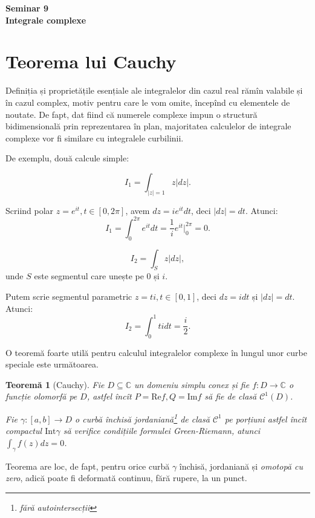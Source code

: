\documentclass[12pt,a4paper]{article}
\newcommand\kal{\mathcal}
\newcommand\ds{\displaystyle}
\newcommand\seq{\subseteq}
\newcommand\CC{\mathbb{C}}
\theoremstyle{dotless}
\newtheorem{theorem}{Teorem\u{a}}
\theoremstyle{dotlessdr}
\begin{document}

\begin{center}
  {\large\textbf{Seminar 9 \\
      Integrale complexe}}
\end{center}

\vspace{2cm}

\section*{Teorema lui Cauchy}

\indent\indent Definiția și proprietățile esențiale ale integralelor din cazul real
rămîn valabile și în cazul complex, motiv pentru care le vom omite, începînd cu elementele
de noutate. De fapt, dat fiind că numerele complexe impun o structură bidimensională
prin reprezentarea în plan, majoritatea calculelor de integrale complexe vor fi
similare cu integralele curbilinii.

De exemplu, două calcule simple:

\[
  I_1 = \ds\int_{|z| = 1} z |dz|.
\]

Scriind polar $ z = e^{it}, t \in [0, 2\pi] $, avem $ dz = ie^{it} dt $, deci
$ |dz| = dt $. Atunci:
\[
  I_1 = \int_0^{2\pi} e^{it} dt = \frac{1}{i} e^{it} \Big|_0^{2\pi} = 0.
\]

\[
  I_2 = \int_S z |dz|,
\]
unde $ S $ este segmentul care unește pe $ 0 $ și $ i $.

Putem scrie segmentul parametric $ z = ti, t \in [0, 1] $, deci $ dz = idt $ și
$ |dz| = dt $. Atunci:
\[
  I_2 = \int_0^1 tidt = \frac{i}{2}.
\]

O teoremă foarte utilă pentru calculul integralelor complexe în lungul unor
curbe speciale este următoarea.

\begin{theorem}[Cauchy]\label{thm:cauchy}
  Fie $ D \seq \CC $ un domeniu simplu conex și fie $ f : D \to \CC $ o funcție
  olomorfă pe $ D $, astfel încît $ P = \mathrm{Re} f, Q = \mathrm{Im} f $ să fie
  de clasă $ \kal{C}^1(D) $.

  Fie $ \gamma : [a, b] \to D $ o curbă închisă jordaniană\footnote{fără autointersecții}
  de clasă $ \kal{C}^1 $ pe porțiuni astfel încît compactul $ \mathrm{Int}\gamma $ să
  verifice condițiile formulei Green-Riemann, atunci $ \ds\int_\gamma f(z) dz = 0 $.
\end{theorem}

Teorema are loc, de fapt, pentru orice curbă $ \gamma $ închisă, jordaniană și
\emph{omotopă cu zero}, adică poate fi deformată continuu, fără rupere, la un punct.
\end{document}
